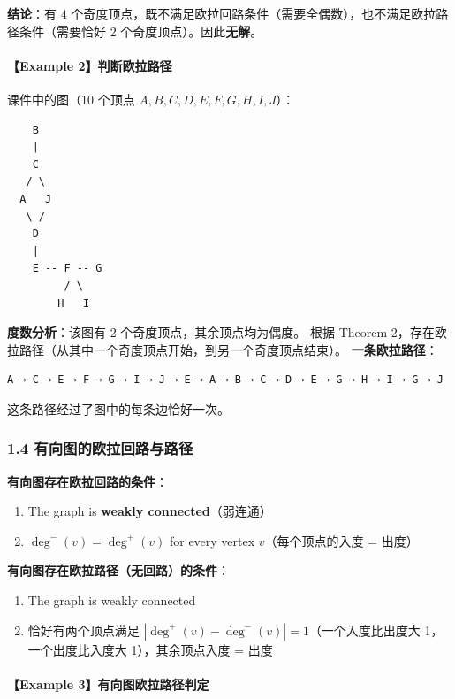 \documentclass[10pt,a4paper,openany]{ctexbook}
\theoremstyle{definition}
\theoremstyle{remark}
\begin{document}
\textbf{结论}：有 4 个奇度顶点，既不满足欧拉回路条件（需要全偶数），也不满足欧拉路径条件（需要恰好 2 个奇度顶点）。因此\textbf{无解}。
\paragraph{【Example 2】判断欧拉路径}

课件中的图（10 个顶点 $A,B,C,D,E,F,G,H,I,J$）：
{\footnotesize\begin{verbatim}
    B
    |
    C
   / \
  A   J
   \ /
    D
    |
    E -- F -- G
         / \
        H   I
\end{verbatim}}

\textbf{度数分析}：该图有 2 个奇度顶点，其余顶点均为偶度。
根据 Theorem 2，存在欧拉路径（从其中一个奇度顶点开始，到另一个奇度顶点结束）。
\textbf{一条欧拉路径}：
{\footnotesize\begin{verbatim}
A → C → E → F → G → I → J → E → A → B → C → D → E → G → H → I → G → J
\end{verbatim}}

这条路径经过了图中的每条边恰好一次。
\vspace{-2pt}

\subsubsection{1.4 有向图的欧拉回路与路径}

\textbf{有向图存在欧拉回路的条件}：
\begin{enumerate}
\item The graph is \textbf{weakly connected}（弱连通）
\item $\deg^-(v) = \deg^+(v)$ for every vertex $v$（每个顶点的入度 = 出度）

\end{enumerate}

\textbf{有向图存在欧拉路径（无回路）的条件}：
\begin{enumerate}
\item The graph is weakly connected
\item 恰好有两个顶点满足 $|\deg^+(v) - \deg^-(v)| = 1$（一个入度比出度大 1，一个出度比入度大 1），其余顶点入度 = 出度

\end{enumerate}

\paragraph{【Example 3】有向图欧拉路径判定}
\end{document}
